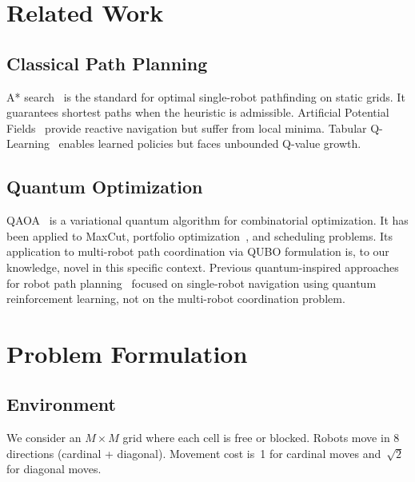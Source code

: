 \documentclass[conference]{IEEEtran}
\begin{document}
\section{Related Work}
\label{sec:related}

\subsection{Classical Path Planning}

A* search~\cite{hart1968formal} is the standard for optimal single-robot pathfinding on static grids. It guarantees shortest paths when the heuristic is admissible. Artificial Potential Fields~\cite{khatib1986real} provide reactive navigation but suffer from local minima. Tabular Q-Learning~\cite{watkins1992qlearning} enables learned policies but faces unbounded Q-value growth.

\subsection{Quantum Optimization}

QAOA~\cite{farhi2014qaoa} is a variational quantum algorithm for combinatorial optimization. It has been applied to MaxCut, portfolio optimization~\cite{lucas2014ising}, and scheduling problems. Its application to multi-robot path coordination via QUBO formulation is, to our knowledge, novel in this specific context. Previous quantum-inspired approaches for robot path planning~\cite{dong2008quantum, hybridpaper2023} focused on single-robot navigation using quantum reinforcement learning, not on the multi-robot coordination problem.

\section{Problem Formulation}
\label{sec:problem}

\subsection{Environment}

We consider an $M \times M$ grid where each cell is free or blocked. Robots move in 8 directions (cardinal + diagonal). Movement cost is~1 for cardinal moves and~$\sqrt{2}$ for diagonal moves.
\end{document}
